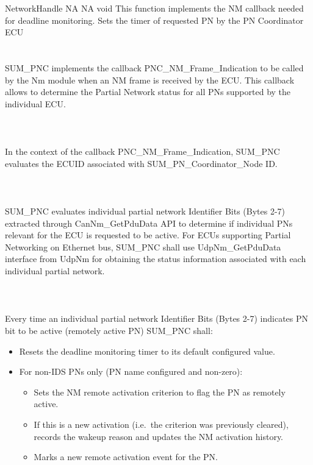 { \hspace*{1.5in} \vrule \hspace*{0.1in} NetworkHandle}
{NA}
{NA}
{void}
{This function implements the NM callback needed for deadline monitoring. Sets the timer of requested PN by the PN Coordinator ECU}
\\
\\
\\
SUM_PNC implements the callback PNC_NM_Frame_Indication to be called by the Nm module when an NM frame is received by the ECU. This callback allows to determine the Partial Network status for all PNs supported by the individual ECU.
\\
{ }
\\
\\
\\
In the context of the callback PNC_NM_Frame_Indication, SUM_PNC evaluates the ECUID associated with SUM_PN_Coordinator_Node ID.
\\
{ }
\\
\\
\\
SUM_PNC evaluates individual partial network Identifier Bits (Bytes 2-7) extracted through CanNm_GetPduData API to determine if individual PNs relevant for the ECU is requested to be active. For ECUs supporting Partial Networking on Ethernet bus, SUM_PNC shall use UdpNm_GetPduData interface from UdpNm for obtaining the status information associated with each individual partial network.
\\
{  }
\\
\\
\\
Every time an individual partial network Identifier Bits (Bytes 2-7) indicates PN bit to be active (remotely active PN) SUM_PNC shall:
\begin{itemize}
  \item Resets the deadline monitoring timer to its default configured value.
  \item For non-IDS PNs only (PN name configured and non-zero):
  \begin{itemize}
    \item Sets the NM remote activation criterion to flag the PN as remotely active.
    \item If this is a new activation (i.e.\ the criterion was previously cleared), records the wakeup reason and updates the NM activation history.
    \item Marks a new remote activation event for the PN.
  \end{itemize}
\end{itemize}

